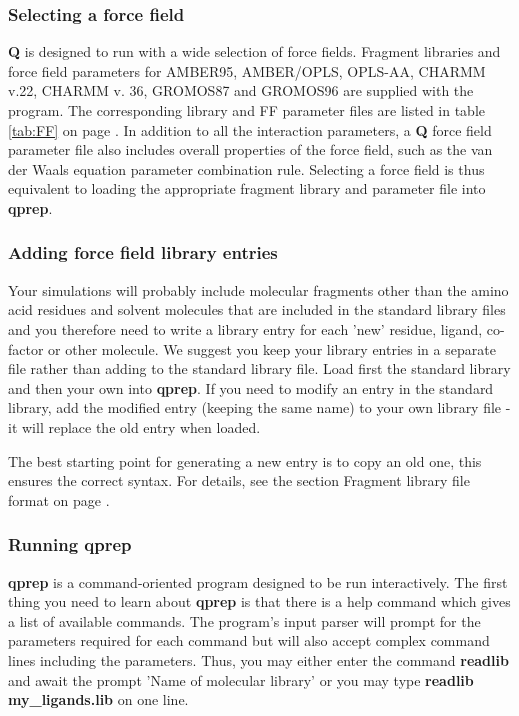 \documentclass[a4paper,10pt]{article}
\begin{document}
\subsubsection{Selecting a force field}
\textbf{Q} is designed  to run with a wide selection  of force fields.
Fragment libraries and force field parameters for AMBER95, AMBER/OPLS,
OPLS-AA, CHARMM v.22, CHARMM v. 36, GROMOS87 and GROMOS96 are supplied
with the program. The corresponding library and FF parameter files are
listed in table \ref{tab:FF} on page \pageref{tab:FF}.  In addition to
all  the interaction  parameters, a  \textbf{Q} force  field parameter
file also includes overall properties of  the force field, such as the
van der Waals  equation parameter combination rule.  Selecting a force
field is thus  equivalent to loading the  appropriate fragment library
and parameter file into \textbf{qprep}.


\subsubsection{Adding force field library entries}
Your simulations will probably  include molecular fragments other than
the amino acid residues and solvent molecules that are included in the
standard library files and you therefore need to write a library entry
for  each  'new' residue,  ligand,  co-factor  or other  molecule.  We
suggest you keep  your library entries in a separate  file rather than
adding to the standard library  file.  Load first the standard library
and then your own into \textbf{qprep}.  If you need to modify an entry
in  the standard  library, add  the modified  entry (keeping  the same
name) to your  own library file -  it will replace the  old entry when
loaded.

The best starting point for generating a new entry is to copy an
old one, this ensures the correct syntax. For details, see the
section Fragment library file format on page
\pageref{subsubsec:fragment_lib_f_f}.


\subsubsection{Running \textbf{qprep}}
\textbf{qprep}  is  a  command-oriented  program designed  to  be  run
interactively. The first thing you  need to learn about \textbf{qprep}
is  that there  is a  help  command which  gives a  list of  available
commands. The  program's input parser  will prompt for  the parameters
required for each  command but will also accept  complex command lines
including  the parameters.  Thus,  you may  either  enter the  command
\textbf{readlib} and await  the prompt 'Name of  molecular library' or
you may type \textbf{readlib my{\_}ligands.lib} on one line.
\end{document}
